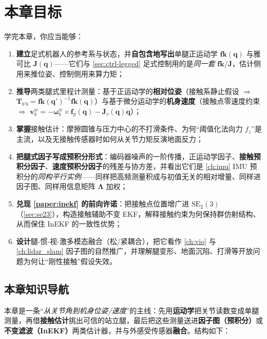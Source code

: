 \section*{本章目标}
学完本章，你应当能够：
\begin{enumerate}
  \item \textbf{建立}足式机器人的参考系与状态，并\textbf{自包含地写出}单腿正运动学 $\mathbf{fk}(\mathbf{q})$ 与雅可比 $\mathbf{J}(\mathbf{q})$——它们与 \cref{sec:ctrl-legged} 足式控制用的是\emph{同一套} $\mathbf{fk}/\mathbf{J}$，估计侧用来推位姿、控制侧用来算力矩；
  \item \textbf{推导}两类腿式里程计测量：基于正运动学的\textbf{相对位姿}（接触系静止假设 $\Rightarrow$ $\mathbf{T}_{b'b}=\mathbf{fk}(\mathbf{q}')^{-1}\mathbf{fk}(\mathbf{q})$）与基于微分运动学的\textbf{机身速度}（接触点零速度约束 $\Rightarrow$ $\mathbf{v}_b^w=-\boldsymbol{\omega}_b^w\times\mathbf{f}_p(\mathbf{q})-\mathbf{J}_v(\mathbf{q})\dot{\mathbf{q}}$）；
  \item \textbf{掌握}接触估计：摩擦圆锥与压力中心的不打滑条件、为何“阈值化法向力 $f_z$”是主流，以及无接触传感器时如何从关节力矩反演地面反力；
  \item \textbf{把腿式因子写成预积分形式}：编码器噪声的一阶传播，正运动学因子、\textbf{接触预积分因子}、\textbf{速度预积分因子}的残差与协方差，并看出它们是 \cref{ch:imu} IMU 预积分的\emph{同构平行实例}——同样把高频测量积成与初值无关的相对增量、同样进因子图、同样用信息矩阵 $\boldsymbol{\Lambda}$ 加权；
  \item \textbf{兑现 \cref{paper:inekf} 的前向许诺}：把接触点位置增广进 $\mathrm{SE}_2(3)$（\cref{sec:se23}），构造接触辅助不变 EKF，解释接触约束为何保持群仿射结构、从而保住 InEKF 的一致性优势；
  \item \textbf{设计}腿-惯-视-激多模态融合（松/紧耦合），把它看作 \cref{ch:vio} 与 \cref{ch:lidar_slam} 因子图的自然推广，并理解腿变形、地面沉陷、打滑等开放问题为何让“刚性接触”假设失效。
\end{enumerate}

\subsection*{本章知识导航}
本章是一条“\emph{从关节角到机身位姿/速度}”的主线：先用\textbf{运动学}把关节读数变成单腿测量，再借\textbf{接触估计}挑出可信的站立腿，最后把这些测量送进\textbf{因子图（预积分）}或\textbf{不变滤波（InEKF）}两类估计器，并与外感受传感器\textbf{融合}。结构如下：

